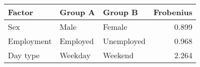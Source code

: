 \begin{tabular}{lllr}
\toprule
Factor & Group A & Group B & Frobenius \\
\midrule
Sex & Male & Female & 0.899 \\
Employment & Employed & Unemployed & 0.968 \\
Day type & Weekday & Weekend & 2.264 \\
\bottomrule
\end{tabular}
